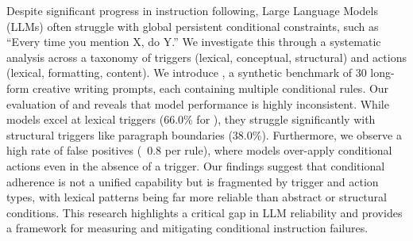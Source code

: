 Despite significant progress in instruction following, Large Language Models (LLMs) often struggle with global persistent conditional constraints, such as ``Every time you mention X, do Y.''
We investigate this \ifcapacity through a systematic analysis across a taxonomy of triggers (lexical, conceptual, structural) and actions (lexical, formatting, content).
We introduce \benchmark, a synthetic benchmark of 30 long-form creative writing prompts, each containing multiple conditional rules.
Our evaluation of \gptlarge and \gptmini reveals that model performance is highly inconsistent.
While models excel at lexical triggers (66.0\% for \gptlarge), they struggle significantly with structural triggers like paragraph boundaries (38.0\%).
Furthermore, we observe a high rate of false positives (~0.8 per rule), where models over-apply conditional actions even in the absence of a trigger.
Our findings suggest that conditional adherence is not a unified capability but is fragmented by trigger and action types, with lexical patterns being far more reliable than abstract or structural conditions.
This research highlights a critical gap in LLM reliability and provides a framework for measuring and mitigating conditional instruction failures.
